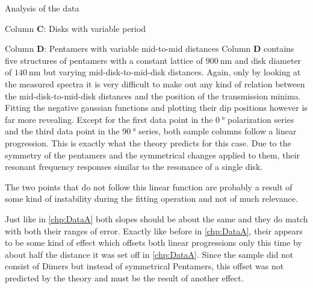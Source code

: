 \documentclass[pdftex, a4paper,11pt, twoside, UKenglish]{report}
\begin{document}
\begin{chapter}{Analysis of the data}
\begin{section}{Column \textbf{C}: Disks with variable period}
    \end{section}
    
    
    
    \newpage
    \begin{section}{Column \textbf{D}: Pentamers with variable mid-to-mid
        distances}
      \label{chp:DataD}
      Column \textbf{D} contains five structures of pentamers with a constant
      lattice of $\SI{900}{\nano\meter}$ and disk diameter of
      $\SI{140}{\nano\meter}$ but varying mid-disk-to-mid-disk distances.
      Again, only by looking at the measured spectra it is very difficult to
      make out any kind of relation between the mid-disk-to-mid-disk distances
      and the position of the transmission minima. Fitting the negative gaussian
      functions and plotting their dip positions however is far more revealing.
      Except for the first data point in the $\SI{0}{\degree}$ polarization
      series and the third data point in the $\SI{90}{\degree}$ series, both
      sample columns follow a linear progression. This is exactly what the
      theory predicts for this case. Due to the symmetry of the pentamers and
      the symmetrical changes applied to them, their resonant frequency
      responses similar to the resonance of a single disk. 

      The two points that do not follow this linear function are probably a
      result of some kind of instability during the fitting operation and not
      of much relevance.

      Just like in \cref{chp:DataA} both slopes should be about the same and
      they do match with both their ranges of error. Exactly like before in
      \cref{chp:DataA}, their appears to be some kind of effect which offsets
      both linear progressions only this time by about half the distance it
      was set off in \cref{chp:DataA}. Since the sample did not consist of
      Dimers but instead of symmetrical Pentamers, this offset was not predicted
      by the theory and must be the result of another effect.
      

\end{section}
\end{chapter}
\end{document}
